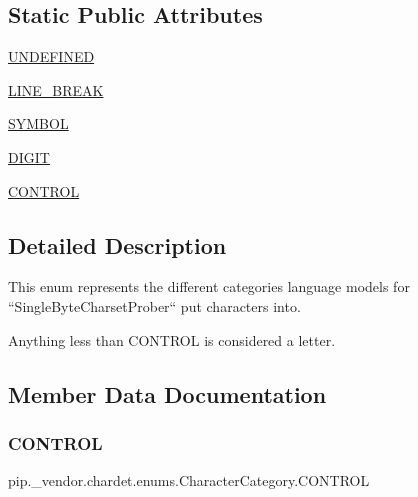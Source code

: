 \subsection*{Static Public Attributes}
\begin{DoxyCompactItemize}
\item 
\hyperlink{classpip_1_1__vendor_1_1chardet_1_1enums_1_1CharacterCategory_a7c7c80acfb254884e072ad2e0a1bdbc5}{U\+N\+D\+E\+F\+I\+N\+ED}
\item 
\hyperlink{classpip_1_1__vendor_1_1chardet_1_1enums_1_1CharacterCategory_a4ded7b33995e536cfc4d7ee0f3b7914c}{L\+I\+N\+E\+\_\+\+B\+R\+E\+AK}
\item 
\hyperlink{classpip_1_1__vendor_1_1chardet_1_1enums_1_1CharacterCategory_aafcac45a8b02f33e654988d02efb1553}{S\+Y\+M\+B\+OL}
\item 
\hyperlink{classpip_1_1__vendor_1_1chardet_1_1enums_1_1CharacterCategory_a5a039e0816adef2338d09bcd0650445c}{D\+I\+G\+IT}
\item 
\hyperlink{classpip_1_1__vendor_1_1chardet_1_1enums_1_1CharacterCategory_a3da55173b7b78f10abe87093baa1dd93}{C\+O\+N\+T\+R\+OL}
\end{DoxyCompactItemize}


\subsection{Detailed Description}
\begin{DoxyVerb}This enum represents the different categories language models for
``SingleByteCharsetProber`` put characters into.

Anything less than CONTROL is considered a letter.
\end{DoxyVerb}
 

\subsection{Member Data Documentation}
\mbox{\label{classpip_1_1__vendor_1_1chardet_1_1enums_1_1CharacterCategory_a3da55173b7b78f10abe87093baa1dd93}} 
\subsubsection{\texorpdfstring{C\+O\+N\+T\+R\+OL}{CONTROL}}
{\footnotesize\ttfamily pip.\+\_\+vendor.\+chardet.\+enums.\+Character\+Category.\+C\+O\+N\+T\+R\+OL\hspace{0.3cm}{\ttfamily [static]}}

